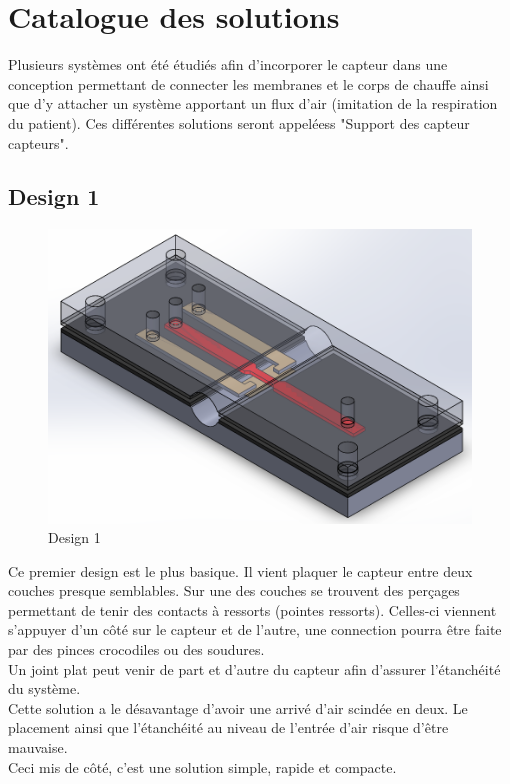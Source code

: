 \section{Catalogue des solutions}
\label{chap:catalogueSol}
Plusieurs systèmes ont été étudiés afin d'incorporer le capteur dans une conception permettant de connecter les membranes et le corps de chauffe
ainsi que d'y attacher un système apportant un flux d'air (imitation de la respiration du patient). Ces différentes solutions seront appeléess
"Support des capteur \gls{capteur}s".

\subsection{Design 1}
\begin{figure}[H]
    \centering
    \includegraphics[scale = 0.3]{images/Design1.png}
    \caption{Design 1}
    \label{fig:design1}
\end{figure}
Ce premier design est le plus basique. Il vient plaquer le capteur entre deux couches presque semblables. Sur une des couches se trouvent des
perçages permettant de tenir des contacts à ressorts (pointes ressorts). Celles-ci viennent s'appuyer d'un côté sur le capteur et
de l'autre, une  connection pourra être faite par des pinces crocodiles ou des soudures. \\
Un joint plat peut venir de part et d'autre du capteur afin d'assurer l'étanchéité du système.\\
Cette solution a le désavantage d'avoir une arrivé d'air scindée en deux. Le placement ainsi que l'étanchéité au niveau de l'entrée
d'air risque d'être mauvaise. \\
Ceci mis de côté, c'est une solution simple, rapide et compacte.

